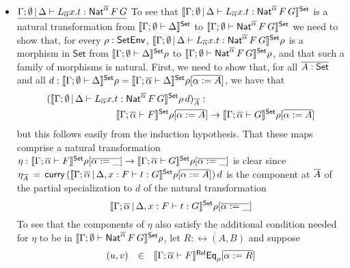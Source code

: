 \documentclass{lmcs}
\theoremstyle{plain}\newtheorem{satz}[thm]{Satz}
\newcommand{\set}{\mathsf{Set}}
\begin{document}
{\begin{itemize}
\item $\underline{\Gamma; \emptyset \,|\, \Delta \vdash
  L_{\overline{\alpha}} x.t : \mathsf{Nat}^{\overline{\alpha}} \,F \,G}$ \; To
  see that $\setsem{\Gamma; \emptyset \,|\, \Delta \vdash
    L_{\overline{\alpha}} x.t : \Nat^{\overline{\alpha}} \,F \,G}$ is
  a natural transformation from $\setsem{\Gamma; \emptyset \vdash
    \Delta}$ to $\setsem{\Gamma; \emptyset \vdash
    \Nat^{\overline{\alpha}} \,F \,G}$ we need to show that, for every
  $\rho : \mathsf{SetEnv}$, $\setsem{\Gamma; \emptyset \,|\, \Delta \vdash
    L_{\overline{\alpha}} x.t : \Nat^{\overline{\alpha}} \,F \,G}\rho$
  is a morphism in $\set$ from $\setsem{\Gamma; \emptyset \vdash
    \Delta}\rho$ to $\setsem{\Gamma; \emptyset \vdash
    \Nat^{\overline{\alpha}} \,F \,G}\rho$, and that such a family of
  morphisms is natural.  First, we need to show that, for all $\ol{A :
    \set}$ and all $d : \setsem{\Gamma; \emptyset \vdash \Delta}\rho =
  \setsem{\Gamma; \ol{\alpha} \vdash \Delta}\rho[\overline{\alpha :=
      A}]$, we have that
  \begin{align*}
      &(\setsem{\Gamma; \emptyset \,|\, \Delta \vdash L_{\overline{\alpha}}
      x.t : \Nat^{\overline{\alpha}} \,F \,G}\rho\,d)_{\ol{A}} :  \\
      &\hspace{1in} \setsem{\Gamma; \ol{\alpha} \vdash F}\rho[\overline{\alpha := A}]
    \to \setsem{\Gamma; \ol{\alpha} \vdash G}\rho[\overline{\alpha :=
        A}]
  \end{align*}
      but this follows easily from the induction hypothesis.
That these maps comprise a natural transformation $\eta :
\setsem{\Gamma; \ol{\alpha} \vdash F}\rho[\overline{\alpha := \_}] \to
\setsem{\Gamma; \ol{\alpha} \vdash G}\rho[\overline{\alpha := \_}]$ is
clear since $\eta_{\ol{A}} \, = \, \curry\,
(\setsem{\Gamma; \overline{\alpha} \,|\, \Delta, x : F \vdash t:
  G}\rho[\overline{\alpha := A}])\,d$ is the component at $\overline{A}$ of
the partial specialization to $d$ of the natural transformation
$$\setsem{\Gamma; \overline{\alpha} \,|\, \Delta, x : F \vdash t:
  G}\rho[\overline{\alpha := \_}]$$  To see that the components of
$\eta$ also satisfy the additional condition needed for $\eta$ to
be in $\setsem{\Gamma; \emptyset \vdash \Nat^{\overline{\alpha}} \,F
  \,G}\rho$, let $\overline{R : \rel(A, B)}$ and suppose
\[\begin{array}{lll}
(u, v) &  \in & \llbracket{\Gamma;\overline{\alpha} \vdash F}\rrbracket^{\mathsf{Rel}}
\mathsf{Eq}_{\rho}[\overline{\alpha := R}]\\

\end{array}\]
\end{itemize}}
\end{document}
